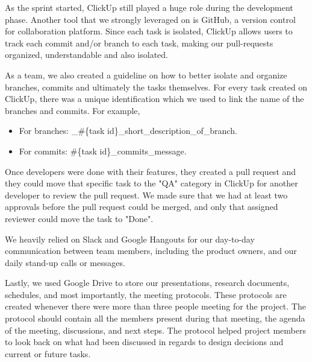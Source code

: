 As the sprint started, ClickUp still played a huge role during the development phase. Another tool that we strongly leveraged on is GitHub, a version control for collaboration platform. Since each task is isolated, ClickUp allows users to track each commit and/or branch to each task, making our pull-requests organized, understandable and also isolated.

As a team, we also created a guideline on how to better isolate and organize branches, commits and ultimately the tasks themselves. For every task created on ClickUp, there was a unique identification which we used to link the name of the branches and commits. For example,

\begin{itemize}
\item For branches: \_\#\{task id\}\_short\_description\_of\_branch.
\item For commits: \#\{task id\}\_commits\_message.
\end{itemize}


Once developers were done with their features, they created a pull request and they could move that specific task to the "QA" category in ClickUp for another developer to review the pull request. We made sure that we had at least two approvals before the pull request could be merged, and only that assigned reviewer could move the task to "Done".

We heavily relied on Slack and Google Hangouts for our day-to-day communication between team members, including the product owners, and our daily stand-up calls or messages.

Lastly, we used Google Drive to store our presentations, research documents, schedules, and most importantly, the meeting protocols. These protocols are created whenever there were more than three people meeting for the project. The protocol should contain all the members present during that meeting, the agenda of the meeting, discussions, and next steps. The protocol helped project members to look back on what had been discussed in regards to design decisions and current or future tasks.


\newpage
